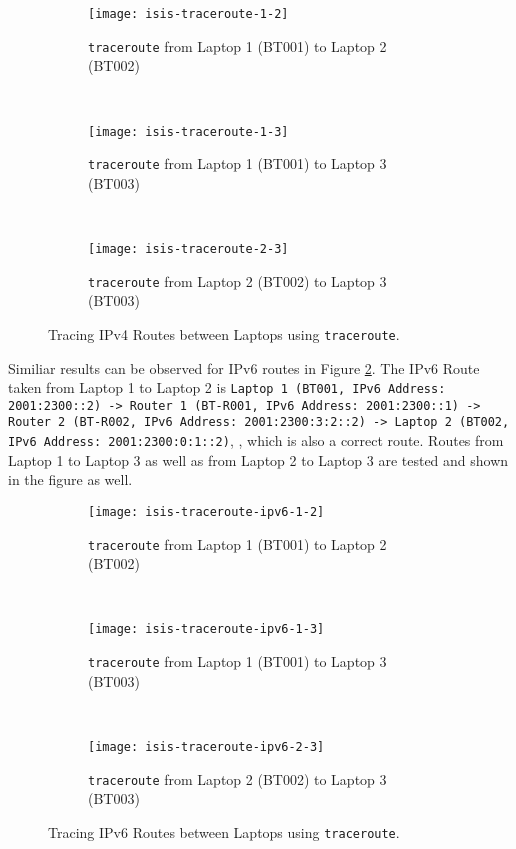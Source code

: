 \begin{figure}[ht!]
    \centering
    \begin{subfigure}[b]{\textwidth}
        \centering
        \texttt{[image: isis-traceroute-1-2]}
        \caption{\texttt{traceroute} from Laptop 1 (BT001) to Laptop 2 (BT002)}
    \end{subfigure}
    ~
    \begin{subfigure}[b]{\textwidth}
        \centering
        \texttt{[image: isis-traceroute-1-3]}
        \caption{\texttt{traceroute} from Laptop 1 (BT001) to Laptop 3 (BT003)}
    \end{subfigure}
    ~
    \begin{subfigure}[b]{\textwidth}
        \centering
        \texttt{[image: isis-traceroute-2-3]}
        \caption{\texttt{traceroute} from Laptop 2 (BT002) to Laptop 3 (BT003)}
    \end{subfigure}
    \caption{Tracing IPv4 Routes between Laptops using \texttt{traceroute}.}
    \label{fig:isis-traceroute}
\end{figure}

Similiar results can be observed for IPv6 routes in Figure \ref{fig:isis-traceroute-ipv6}. The IPv6 Route taken from Laptop 1 to Laptop 2 is 
\texttt{Laptop 1 (BT001, IPv6 Address: 2001:2300::2)
-> Router 1 (BT-R001, IPv6 Address: 2001:2300::1) 
-> Router 2 (BT-R002, IPv6 Address: 2001:2300:3:2::2)
-> Laptop 2 (BT002, IPv6 Address: 2001:2300:0:1::2)}, , which is also a correct route.
Routes from Laptop 1 to Laptop 3 as well as from Laptop 2 to Laptop 3 are tested and shown in the figure as well.


\begin{figure}[ht!]
    \centering
    \begin{subfigure}[b]{\textwidth}
        \centering
        \texttt{[image: isis-traceroute-ipv6-1-2]}
        \caption{\texttt{traceroute} from Laptop 1 (BT001) to Laptop 2 (BT002)}
    \end{subfigure}
    ~
    \begin{subfigure}[b]{\textwidth}
        \centering
        \texttt{[image: isis-traceroute-ipv6-1-3]}
        \caption{\texttt{traceroute} from Laptop 1 (BT001) to Laptop 3 (BT003)}
    \end{subfigure}
    ~
    \begin{subfigure}[b]{\textwidth}
        \centering
        \texttt{[image: isis-traceroute-ipv6-2-3]}
        \caption{\texttt{traceroute} from Laptop 2 (BT002) to Laptop 3 (BT003)}
    \end{subfigure}
    \caption{Tracing IPv6 Routes between Laptops using \texttt{traceroute}.}
    \label{fig:isis-traceroute-ipv6}
\end{figure}

